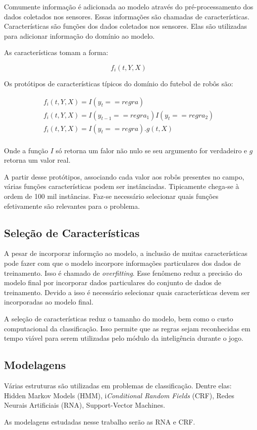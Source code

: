 Comumente informação é adicionada ao modelo através do pré-processamento dos
dados coletados nos sensores. Essas informações são chamadas de características.
Características são funções dos dados coletados nos sensores. Elas são utilizadas
para adicionar informação do domínio ao modelo.

As características tomam a forma:

\begin{centering}
\begin{equation}
f_i(t,Y,X)
\end{equation}
\end{centering}

Os protótipos de características típicos do domínio do futebol de robôs são:

\begin{centering}
\begin{eqnarray}
f_i(t,Y,X)=I(y_t == regra)\\
f_i(t,Y,X)=I(y_{t-1} == regra_1)I(y_t == regra_2)\\
f_i(t,Y,X)=I(y_t == regra).g(t,X)\\
\end{eqnarray}
\end{centering}

Onde a função $I$ só retorna um falor não nulo se seu argumento for verdadeiro e
$g$ retorna um valor real.

A partir desse protótipos, associando cada valor aos robôs presentes
no campo, várias funções características podem ser instânciadas.
Tipicamente chega-se à ordem de 100 mil instâncias. Faz-se necessário
selecionar quais funções efetivamente são relevantes para o problema.

\subsection{Seleção de Características}

A pesar de incorporar informção ao modelo, a inclusão de muitas características
pode fazer com que o modelo incorpore informações particulares dos dados de
treinamento. Isso é chamado de \textit{overfitting}. Esse fenômeno reduz a precisão
do modelo final por incorporar dados particulares do conjunto de dados de
treinamento. Devido a isso é necessário selecionar quais características devem
ser incorporadas ao modelo final.

A seleção de características reduz o tamanho do modelo, bem como o custo
computacional da classificação. Isso permite que as regras sejam reconhecidas
em tempo viável para serem utilizadas pelo módulo da inteligência durante o
jogo.

\subsection{Modelagens}

Várias estruturas são utilizadas em problemas de classificação. Dentre elas:
Hidden Markov Models (HMM), i\textit{Conditional Random Fields} (CRF), Redes Neurais Artificiais (RNA), Support-Vector Machines.

As modelagens estudadas nesse trabalho serão as RNA e CRF.
